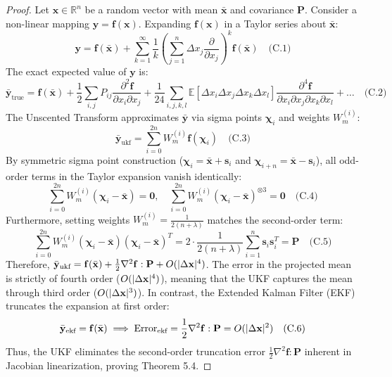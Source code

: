 \documentclass[preprint,12pt,authoryear]{elsarticle}
\theoremstyle{definition}
\begin{document}
\begin{proof}
Let $\mathbf{x} \in \mathbb{R}^n$ be a random vector with mean $\bar{\mathbf{x}}$ and covariance $\mathbf{P}$. Consider a non-linear mapping $\mathbf{y} = \mathbf{f}(\mathbf{x})$. Expanding $\mathbf{f}(\mathbf{x})$ in a Taylor series about $\bar{\mathbf{x}}$: $$\mathbf{y} = \mathbf{f}(\bar{\mathbf{x}}) + \sum_{k=1}^\infty \frac{1}{k\!} \left( \sum_{j=1}^n \Delta x_j \frac{\partial}{\partial x_j} \right)^k \mathbf{f}(\bar{\mathbf{x}}) \quad \text{(C.1)}$$ The exact expected value of $\mathbf{y}$ is: $$\bar{\mathbf{y}}_{\text{true}} = \mathbf{f}(\bar{\mathbf{x}}) + \frac{1}{2} \sum_{i,j} P_{ij} \frac{\partial^2 \mathbf{f}}{\partial x_i \partial x_j} + \frac{1}{24} \sum_{i,j,k,l} \mathbb{E}[\Delta x_i \Delta x_j \Delta x_k \Delta x_l] \frac{\partial^4 \mathbf{f}}{\partial x_i \partial x_j \partial x_k \partial x_l} + \dots \quad \text{(C.2)}$$ The Unscented Transform approximates $\bar{\mathbf{y}}$ via sigma points $\boldsymbol{\chi}_i$ and weights $W_m^{(i)}$: $$\bar{\mathbf{y}}_{\text{ukf}} = \sum_{i=0}^{2n} W_m^{(i)} \mathbf{f}(\boldsymbol{\chi}_i) \quad \text{(C.3)}$$ By symmetric sigma point construction ($\boldsymbol{\chi}_i = \bar{\mathbf{x}} + \mathbf{s}_i$ and $\boldsymbol{\chi}_{i+n} = \bar{\mathbf{x}} - \mathbf{s}_i$), all odd-order terms in the Taylor expansion vanish identically: $$\sum_{i=0}^{2n} W_m^{(i)} (\boldsymbol{\chi}_i - \bar{\mathbf{x}}) = \mathbf{0}, \quad \sum_{i=0}^{2n} W_m^{(i)} (\boldsymbol{\chi}_i - \bar{\mathbf{x}})^{\otimes 3} = \mathbf{0} \quad \text{(C.4)}$$ Furthermore, setting weights $W_m^{(i)} = \frac{1}{2(n+\lambda)}$ matches the second-order term: $$\sum_{i=0}^{2n} W_m^{(i)} (\boldsymbol{\chi}_i - \bar{\mathbf{x}})(\boldsymbol{\chi}_i - \bar{\mathbf{x}})^T = 2 \cdot \frac{1}{2(n+\lambda)} \sum_{i=1}^n \mathbf{s}_i \mathbf{s}_i^T = \mathbf{P} \quad \text{(C.5)}$$ Therefore, $\bar{\mathbf{y}}_{\text{ukf}} = \mathbf{f}(\bar{\mathbf{x}}) + \frac{1}{2} \nabla^2 \mathbf{f} : \mathbf{P} + O(\\|\Delta \mathbf{x}\\|^4)$. The error in the projected mean is strictly of fourth order ($O(\\|\Delta \mathbf{x}\\|^4)$), meaning that the UKF captures the mean through third order ($O(\\|\Delta \mathbf{x}\\|^3)$). In contrast, the Extended Kalman Filter (EKF) truncates the expansion at first order: $$\bar{\mathbf{y}}_{\text{ekf}} = \mathbf{f}(\bar{\mathbf{x}}) \implies \text{Error}_{\text{ekf}} = \frac{1}{2} \nabla^2 \mathbf{f} : \mathbf{P} = O(\\|\Delta \mathbf{x}\\|^2) \quad \text{(C.6)}$$ Thus, the UKF eliminates the second-order truncation error $\frac{1}{2} \nabla^2 \mathbf{f} : \mathbf{P}$ inherent in Jacobian linearization, proving Theorem 5.4. \end{proof}


\end{document}
